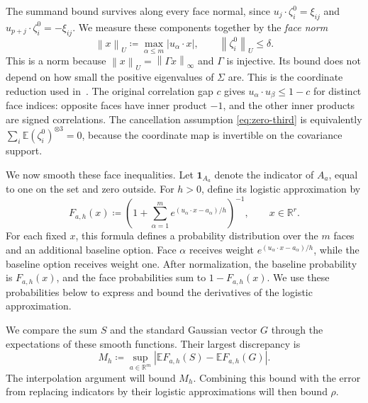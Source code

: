 \documentclass[11pt,letterpaper]{article}
\theoremstyle{remark}
\newcommand{\E}{\mathbb E}
\newcommand{\R}{\mathbb R}
\newcommand{\norm}[1]{\left\lVert#1\right\rVert}
\newcommand{\ind}{\mathbf 1}
\begin{document}
The summand bound survives along every face normal, since
\(u_j\cdot\zeta_i^0=\xi_{ij}\) and
\(u_{p+j}\cdot\zeta_i^0=-\xi_{ij}\). We measure these components
together by the \emph{face norm}
\[
 \norm x_U\coloneqq\max_{\alpha\le m}|u_\alpha\cdot x|,
 \qquad \norm{\zeta_i^0}_U\le\delta.
\]
This is a norm because \(\norm x_U=\norm{\Gamma x}_\infty\)
and \(\Gamma\) is injective. Its bound does not depend on how small
the positive eigenvalues of \(\Sigma\) are. This is the coordinate
reduction used in~\cite[Section~2.3]{GaoZhang}. The original
correlation gap \(c\) gives
\(u_\alpha\cdot u_\beta\le1-c\) for distinct face indices:
opposite faces have inner product \(-1\), and the other inner
products are signed correlations. The cancellation assumption
\eqref{eq:zero-third} is equivalently
\(\sum_i\E(\zeta_i^0)^{\otimes3}=0\), because the coordinate
map is invertible on the covariance support.

We now smooth these face inequalities. Let \(\ind_{A_a}\) denote
the indicator of \(A_a\), equal to one on the set and zero outside.
For \(h>0\), define its logistic approximation by
\begin{equation}
 F_{a,h}(x)\coloneqq
 \left(1+\sum_{\alpha=1}^m
 e^{(u_\alpha\cdot x-a_\alpha)/h}\right)^{-1},
 \qquad x\in\R^r.
 \label{eq:selector}
\end{equation}
For each fixed \(x\), this formula defines a probability distribution
over the \(m\) faces and an additional baseline option. Face
\(\alpha\) receives weight \(e^{(u_\alpha\cdot x-a_\alpha)/h}\),
while the baseline option receives weight one. After normalization,
the baseline probability is \(F_{a,h}(x)\), and the face probabilities
sum to \(1-F_{a,h}(x)\). We use these probabilities below to express
and bound the derivatives of the logistic approximation.

We compare the sum \(S\) and the standard Gaussian vector \(G\)
through the expectations of these smooth functions. Their largest
discrepancy is
\begin{equation}
 M_h\coloneqq\sup_{a\in\R^m}
 \left|\E F_{a,h}(S)-\E F_{a,h}(G)\right|.
 \label{eq:smoothed-discrepancy}
\end{equation}
The interpolation argument will bound \(M_h\). Combining this
bound with the error from replacing indicators by their logistic
approximations will then bound \(\rho\).
\end{document}
